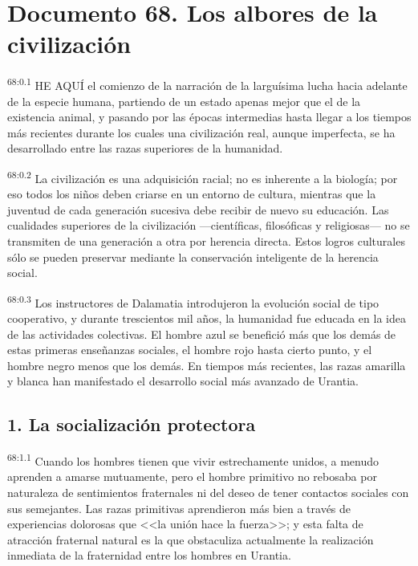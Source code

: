 \documentclass[twoside, 11pt]{book}
\begin{document}
\pagestyle{main}
\renewcommand{\makeheadrule}{\rule[-.6\baselineskip]{\linewidth}{.4pt}}



\chapter{Documento 68. Los albores de la civilización}
\par
\textsuperscript{68:0.1} HE AQUÍ el comienzo de la narración de la larguísima lucha hacia adelante de la especie humana, partiendo de un estado apenas mejor que el de la existencia animal, y pasando por las épocas intermedias hasta llegar a los tiempos más recientes durante los cuales una civilización real, aunque imperfecta, se ha desarrollado entre las razas superiores de la humanidad.

\par
\textsuperscript{68:0.2} La civilización es una adquisición racial; no es inherente a la biología; por eso todos los niños deben criarse en un entorno de cultura, mientras que la juventud de cada generación sucesiva debe recibir de nuevo su educación. Las cualidades superiores de la civilización ---científicas, filosóficas y religiosas--- no se transmiten de una generación a otra por herencia directa. Estos logros culturales sólo se pueden preservar mediante la conservación inteligente de la herencia social.

\par
\textsuperscript{68:0.3} Los instructores de Dalamatia introdujeron la evolución social de tipo cooperativo, y durante trescientos mil años, la humanidad fue educada en la idea de las actividades colectivas. El hombre azul se benefició más que los demás de estas primeras enseñanzas sociales, el hombre rojo hasta cierto punto, y el hombre negro menos que los demás. En tiempos más recientes, las razas amarilla y blanca han manifestado el desarrollo social más avanzado de Urantia.

\section*{1. La socialización protectora}
\par
\textsuperscript{68:1.1} Cuando los hombres tienen que vivir estrechamente unidos, a menudo aprenden a amarse mutuamente, pero el hombre primitivo no rebosaba por naturaleza de sentimientos fraternales ni del deseo de tener contactos sociales con sus semejantes. Las razas primitivas aprendieron más bien a través de experiencias dolorosas que <<la unión hace la fuerza>>; y esta falta de atracción fraternal natural es la que obstaculiza actualmente la realización inmediata de la fraternidad entre los hombres en Urantia.
\end{document}
